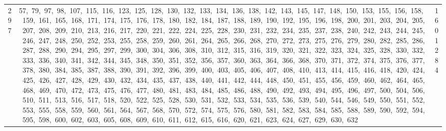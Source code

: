 \begin{longtable}{c|p{}|r}
297 & 57,\ 79,\ 97,\ 98,\ 107,\ 115,\ 116,\ 123,\ 125,\ 128,\ 130,\ 132,\ 133,\ 134,\ 136,\ 138,\ 142,\ 143,\ 145,\ 147,\ 148,\ 150,\ 153,\ 155,\ 156,\ 158,\ 159,\ 161,\ 165,\ 168,\ 171,\ 174,\ 175,\ 176,\ 178,\ 180,\ 182,\ 184,\ 187,\ 188,\ 189,\ 190,\ 192,\ 195,\ 196,\ 198,\ 200,\ 201,\ 203,\ 204,\ 205,\ 207,\ 208,\ 209,\ 210,\ 213,\ 216,\ 217,\ 220,\ 221,\ 222,\ 224,\ 225,\ 228,\ 230,\ 231,\ 232,\ 234,\ 235,\ 237,\ 238,\ 240,\ 242,\ 243,\ 244,\ 245,\ 246,\ 247,\ 248,\ 250,\ 252,\ 253,\ 255,\ 258,\ 259,\ 260,\ 261,\ 264,\ 265,\ 266,\ 268,\ 270,\ 272,\ 273,\ 275,\ 276,\ 279,\ 280,\ 282,\ 285,\ 286,\ 287,\ 288,\ 290,\ 294,\ 295,\ 297,\ 299,\ 300,\ 304,\ 306,\ 308,\ 310,\ 312,\ 315,\ 316,\ 319,\ 320,\ 321,\ 322,\ 323,\ 324,\ 325,\ 328,\ 330,\ 332,\ 333,\ 336,\ 340,\ 341,\ 342,\ 344,\ 345,\ 348,\ 350,\ 351,\ 352,\ 356,\ 357,\ 360,\ 363,\ 364,\ 366,\ 368,\ 370,\ 371,\ 372,\ 374,\ 375,\ 376,\ 377,\ 378,\ 380,\ 384,\ 385,\ 387,\ 388,\ 390,\ 391,\ 392,\ 396,\ 399,\ 400,\ 403,\ 405,\ 406,\ 407,\ 408,\ 410,\ 413,\ 414,\ 415,\ 416,\ 418,\ 420,\ 424,\ 425,\ 426,\ 427,\ 428,\ 429,\ 430,\ 432,\ 434,\ 435,\ 437,\ 438,\ 440,\ 441,\ 442,\ 444,\ 448,\ 450,\ 451,\ 455,\ 456,\ 459,\ 460,\ 462,\ 464,\ 465,\ 468,\ 469,\ 470,\ 472,\ 473,\ 475,\ 476,\ 477,\ 480,\ 481,\ 483,\ 484,\ 485,\ 486,\ 488,\ 490,\ 492,\ 493,\ 494,\ 495,\ 496,\ 497,\ 500,\ 504,\ 506,\ 510,\ 511,\ 513,\ 516,\ 517,\ 518,\ 520,\ 522,\ 525,\ 528,\ 530,\ 531,\ 532,\ 533,\ 534,\ 535,\ 536,\ 539,\ 540,\ 544,\ 546,\ 549,\ 550,\ 551,\ 552,\ 553,\ 555,\ 558,\ 559,\ 560,\ 561,\ 564,\ 567,\ 568,\ 570,\ 572,\ 574,\ 575,\ 576,\ 580,\ 581,\ 582,\ 583,\ 584,\ 585,\ 588,\ 589,\ 590,\ 592,\ 594,\ 595,\ 598,\ 600,\ 602,\ 603,\ 605,\ 608,\ 609,\ 610,\ 611,\ 612,\ 615,\ 616,\ 620,\ 621,\ 623,\ 624,\ 627,\ 629,\ 630,\ 632 & 1601284 \\

\end{longtable}
